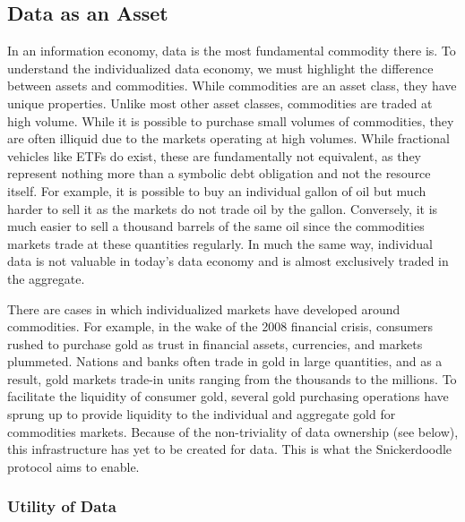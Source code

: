 \subsection{Data as an Asset}
In an information economy, data is the most fundamental commodity there is. To understand the individualized data economy, we must highlight the difference between assets and commodities. While commodities are an asset class, they have unique properties. Unlike most other asset classes, commodities are traded at high volume. While it is possible to purchase small volumes of commodities, they are often illiquid due to the markets operating at high volumes. While fractional vehicles like ETFs do exist, these are fundamentally not equivalent, as they represent nothing more than a symbolic debt obligation and not the resource itself. For example, it is possible to buy an individual gallon of oil but much harder to sell it as the markets do not trade oil by the gallon. Conversely, it is much easier to sell a thousand barrels of the same oil since the commodities markets trade at these quantities regularly. In much the same way, individual data is not valuable in today's data economy and is almost exclusively traded in the aggregate.

There are cases in which individualized markets have developed around commodities. For example, in the wake of the 2008 financial crisis, consumers rushed to purchase gold as trust in financial assets, currencies, and markets plummeted. Nations and banks often trade in gold in large quantities, and as a result, gold markets trade-in units ranging from the thousands to the millions. To facilitate the liquidity of consumer gold, several gold purchasing operations have sprung up to provide liquidity to the individual and aggregate gold for commodities markets. Because of the non-triviality of data ownership (see below), this infrastructure has yet to be created for data. This is what the Snickerdoodle protocol aims to enable.


\subsubsection{Utility of Data}


